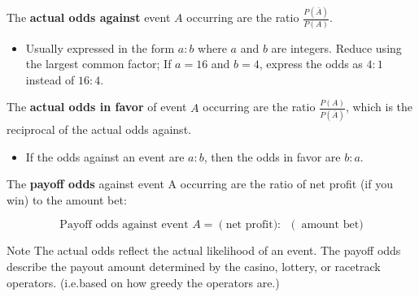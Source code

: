 \documentclass{beamer}
\newcommand{\prob}[1]{P\left(#1\right)}
\begin{document}
\begin{frame}
\begin{definition}
The \textbf{actual odds against} event $A$ occurring are the ratio $\tfrac{\prob{\bar{A}}}{\prob{A}}$.\pause
\begin{itemize}
\item Usually expressed in the form $a:b$ where $a$ and $b$ are integers. Reduce using the largest common factor; If $a=16$ and $b=4$, express the odds as $4:1$ instead of $16:4$.
\end{itemize}\pause

\vspace{1mm}
The \textbf{actual odds in favor} of event $A$ occurring are the ratio $\tfrac{\prob{A}}{\prob{\bar{A}}}$, which is the reciprocal of the actual odds against.\pause
\begin{itemize}
\item If the odds against an event are $a:b$, then the odds in favor are $b:a$.
\end{itemize}\pause

\vspace{1mm}
The \textbf{payoff odds} against event A occurring are the ratio of net profit (if you win) to the amount bet:

\vspace{-4mm}
\begin{equation*}
\text{Payoff odds against event $A$} = \left(\text{net profit}):~\right(\text{amount bet})
\end{equation*}
\end{definition}\pause

\vspace{-0.5mm}
\begin{block}{Note}
The actual odds reflect the actual likelihood of an event. The payoff odds describe the payout amount determined by the casino, lottery, or racetrack operators. (i.e.\@ based on how greedy the operators are.)
\end{block}
\end{frame}
\end{document}
